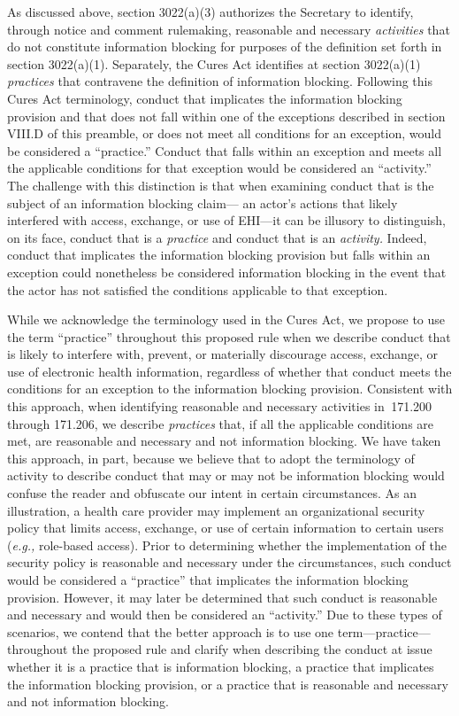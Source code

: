 \documentclass[twoside,11pt]{article}
\begin{document}
          As discussed above, section 3022(a)(3) authorizes the Secretary to identify, through notice and comment rulemaking, reasonable and necessary \emph{activities} that do not constitute information blocking for purposes of the definition set forth in section 3022(a)(1). Separately, the Cures Act identifies at section 3022(a)(1) \emph{practices} that contravene the definition of information blocking. Following this Cures Act terminology, conduct that implicates the information blocking provision and that does not fall within one of the exceptions described in section VIII.D of this preamble, or does not meet all conditions for an exception, would be considered a “practice.” Conduct that falls within an exception and meets all the applicable conditions for that exception would be considered an “activity.” The challenge with this distinction is that when examining conduct that is the subject of an information blocking claim— an actor's actions that likely interfered with access, exchange, or use of EHI—it can be illusory to distinguish, on its face, conduct that is a \emph{practice} and conduct that is an \emph{activity.} Indeed, conduct that implicates the information blocking provision but falls within an exception could nonetheless be considered information blocking in the event that the actor has not satisfied the conditions applicable to that exception.



          While we acknowledge the terminology used in the Cures Act, we propose to use the term “practice” throughout this proposed rule when we describe conduct that is likely to interfere with, prevent, or materially discourage access, exchange, or use of electronic health information, regardless of whether that conduct meets the conditions for an exception to the information blocking provision. Consistent with this approach, when identifying reasonable and necessary activities in \textsection{}\textsection{} 171.200 through 171.206, we describe \emph{practices} that, if all the applicable conditions are met, are reasonable and necessary and not information blocking. We have taken this approach, in part, because we believe that to adopt the terminology of activity to describe conduct that may or may not be information blocking would confuse the reader and obfuscate our intent in certain circumstances. As an illustration, a health care provider may implement an organizational security policy that limits access, exchange, or use of certain information to certain users (\emph{e.g.,} role-based access). Prior to determining whether the implementation of the security policy is reasonable and necessary under the circumstances, such conduct would be considered a “practice” that implicates the information blocking provision. However, it may later be determined that such conduct is reasonable and necessary and would then be considered an “activity.” Due to these types of scenarios, we contend that the better approach is to use one term—practice—throughout the proposed rule and clarify when describing the conduct at issue whether it is a practice that is information blocking, a practice that implicates the information blocking provision, or a practice that is reasonable and necessary and not information blocking.
\end{document}
